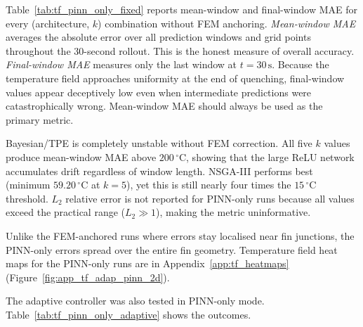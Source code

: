 Table~\ref{tab:tf_pinn_only_fixed} reports mean-window and final-window MAE
for every (architecture, $k$) combination without FEM anchoring.
\emph{Mean-window MAE} averages the absolute error over all prediction windows
and grid points throughout the 30-second rollout. This is the honest measure
of overall accuracy. \emph{Final-window MAE} measures only the last window at
$t=30\,\mathrm{s}$. Because the temperature field approaches uniformity at the
end of quenching, final-window values appear deceptively low even when
intermediate predictions were catastrophically wrong. Mean-window MAE should
always be used as the primary metric.

Bayesian/TPE is completely unstable without FEM correction. All five $k$
values produce mean-window MAE above $200\,^\circ\mathrm{C}$, showing that
the large ReLU network accumulates drift regardless of window length. NSGA-III
performs best (minimum $59.20\,^\circ\mathrm{C}$ at $k=5$), yet this is still
nearly four times the $15\,^\circ\mathrm{C}$ threshold. $L_2$ relative error
is not reported for PINN-only runs because all values exceed the practical
range ($L_2 \gg 1$), making the metric uninformative.

Unlike the FEM-anchored runs where errors stay localised near fin junctions,
the PINN-only errors spread over the entire fin geometry.
Temperature field heat maps for the PINN-only runs are in Appendix~\ref{app:tf_heatmaps} (Figure~\ref{fig:app_tf_adap_pinn_2d}).

The adaptive controller was also tested in PINN-only mode.
Table~\ref{tab:tf_pinn_only_adaptive} shows the outcomes.

\begin{table}[H]
\centering
\caption{Thermal Fin PINN-Only Adaptive-$k$ Rollout: Adaptive Controller Failure Without FEM Correction.
The controller stalls at $k=1$ for all architectures because the first-window error immediately
exceeds the demotion threshold, preventing any window promotion.  Mean-window MAE exceeds $100\,^\circ\mathrm{C}$
in all cases, demonstrating that periodic FEM correction is a necessary condition for stable prediction.}
\label{tab:tf_pinn_only_adaptive}
\end{table}

